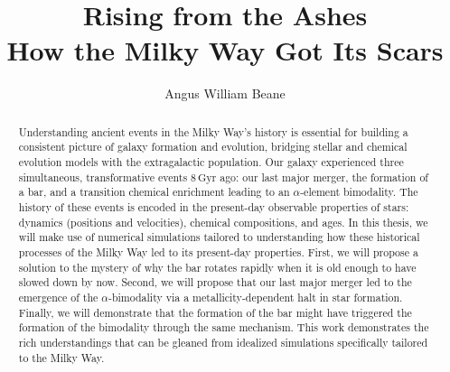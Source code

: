 \documentclass[11pt]{gsasthesis} %
\title{Rising from the Ashes\\How the Milky Way Got Its Scars} %
\author{Angus William Beane} %
\newcommand{\Gyr}{\ensuremath{\textrm{Gyr}}}
\begin{document}


\thesistitlepage
\copyrightpage
\begin{abstract}
  Understanding ancient events in the Milky Way's history is essential for building a consistent picture of galaxy formation and evolution, bridging stellar and chemical evolution models with the extragalactic population. Our galaxy experienced three simultaneous, transformative events $8\,\Gyr$ ago: our last major merger, the formation of a bar, and a transition chemical enrichment leading to an $\alpha$-element bimodality. The history of these events is encoded in the present-day observable properties of stars: dynamics (positions and velocities), chemical compositions, and ages. In this thesis, we will make use of numerical simulations tailored to understanding how these historical processes of the Milky Way led to its present-day properties. First, we will propose a solution to the mystery of why the bar rotates rapidly when it is old enough to have slowed down by now. Second, we will propose that our last major merger led to the emergence of the $\alpha$-bimodality via a metallicity-dependent halt in star formation. Finally, we will demonstrate that the formation of the bar might have triggered the formation of the bimodality through the same mechanism. This work demonstrates the rich understandings that can be gleaned from idealized simulations specifically tailored to the Milky Way.
\end{abstract}

\renewcommand{\contentsname}{\protect\centering\protect\Large Table of Contents}
\renewcommand{\listtablename}{\protect\centering\protect\Large List of Tables}
\renewcommand{\listfigurename}{\protect\centering\protect\Large List of Figures}

\tableofcontents %


\end{document}
